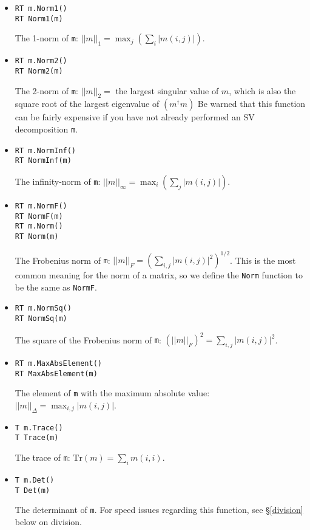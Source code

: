 \documentclass[twoside,letterpaper,11pt]{article}
\renewcommand{\tt}[1]{{\texttt {#1}}}
\begin{document}
\begin{itemize}

\item
\begin{verbatim}
RT m.Norm1()
RT Norm1(m)
\end{verbatim}
The 1-norm of \tt{m}: 
$||m||_1 = \max_j (\sum_i |m(i,j)|)$.

\item
\begin{verbatim}
RT m.Norm2()
RT Norm2(m)
\end{verbatim}
The 2-norm of \tt{m}: $||m||_2 =$ the largest singular value of $m$, which
is also the square root of the largest eigenvalue of $(m^\dagger m)$
Be warned that this function can be fairly expensive if you have not
already performed an SV decomposition \tt{m}.

\item
\begin{verbatim}
RT m.NormInf()
RT NormInf(m)
\end{verbatim}
The infinity-norm of \tt{m}: 
$||m||_\infty = \max_i (\sum_j |m(i,j)|)$.

\item
\begin{verbatim}
RT m.NormF()
RT NormF(m)
RT m.Norm()
RT Norm(m)
\end{verbatim}
The Frobenius norm of \tt{m}: 
$||m||_F = (\sum_{i,j} |m(i,j)|^2)^{1/2}$.
This is the most common meaning for the norm of a matrix, so we
define the \tt{Norm} function to be the same as \tt{NormF}.

\item
\begin{verbatim}
RT m.NormSq()
RT NormSq(m)
\end{verbatim}
The square of the Frobenius norm of \tt{m}: 
$(||m||_F)^2 = \sum_{i,j} |m(i,j)|^2$.

\item
\begin{verbatim}
RT m.MaxAbsElement()
RT MaxAbsElement(m)
\end{verbatim}
The element of \tt{m} with the maximum absolute value: 
$||m||_\Delta = \max_{i,j} |m(i,j)|$.

\item
\begin{verbatim}
T m.Trace()
T Trace(m)
\end{verbatim}
The trace of \tt{m}: $\mathrm{Tr}(m) = \sum_i m(i,i)$.

\item
\begin{verbatim}
T m.Det()
T Det(m)
\end{verbatim}
The determinant of \tt{m}.  For speed issues regarding this function, see 
\S\ref{division} below on division.


\end{itemize}
\end{document}
